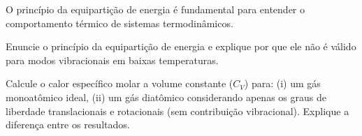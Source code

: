 \documentclass[fleqn,a4paper]{exam}
\theoremstyle{break} \newtheorem{exemplo}{Exemplo}
\theoremstyle{break} \newtheorem{exercicio}{Exercício}
\begin{document}
\begin{questions}
\question[3.0] O princípio da equipartição de energia é fundamental para entender o comportamento térmico de sistemas termodinâmicos.
\begin{parts}
  \item Enuncie o princípio da equipartição de energia e explique por que ele não é válido para modos vibracionais em baixas temperaturas.
  \item Calcule o calor específico molar a volume constante ($C_V$) para: (i) um gás monoatômico ideal, (ii) um gás diatômico considerando apenas os graus de liberdade translacionais e rotacionais (sem contribuição vibracional). Explique a diferença entre os resultados.
\end{parts}

\end{questions}
\end{document}
